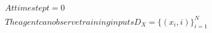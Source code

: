 \documentclass[preview]{standalone}
\begin{document}
\begin{align*}
At time step t = 0\\The agent can observe training inputs D_{X} = \{(x_i, i)\}_{i=1}^{N}
\end{align*}
\end{document}

